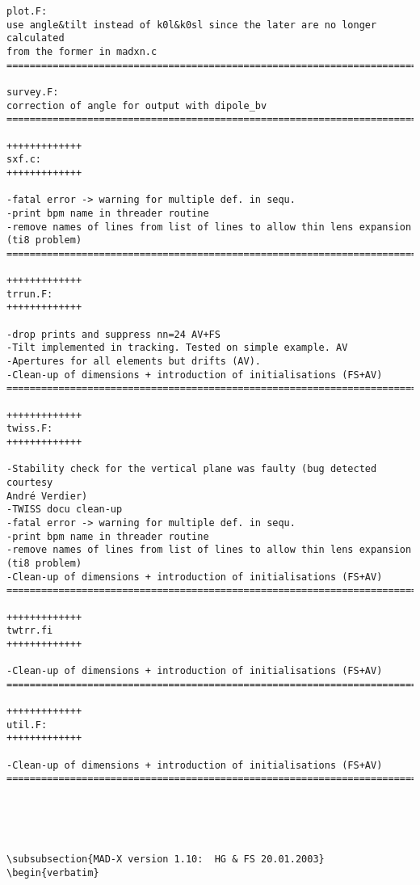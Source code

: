 \begin{verbatim}
plot.F:
use angle&tilt instead of k0l&k0sl since the later are no longer calculated
from the former in madxn.c
=============================================================================

survey.F:
correction of angle for output with dipole_bv
=============================================================================

+++++++++++++
sxf.c:
+++++++++++++

-fatal error -> warning for multiple def. in sequ.
-print bpm name in threader routine
-remove names of lines from list of lines to allow thin lens expansion (ti8 problem)
=============================================================================

+++++++++++++
trrun.F:
+++++++++++++

-drop prints and suppress nn=24 AV+FS
-Tilt implemented in tracking. Tested on simple example. AV
-Apertures for all elements but drifts (AV).
-Clean-up of dimensions + introduction of initialisations (FS+AV)
=============================================================================

+++++++++++++
twiss.F:
+++++++++++++

-Stability check for the vertical plane was faulty (bug detected courtesy
André Verdier)
-TWISS docu clean-up
-fatal error -> warning for multiple def. in sequ.
-print bpm name in threader routine
-remove names of lines from list of lines to allow thin lens expansion (ti8 problem)
-Clean-up of dimensions + introduction of initialisations (FS+AV)
=============================================================================

+++++++++++++
twtrr.fi
+++++++++++++

-Clean-up of dimensions + introduction of initialisations (FS+AV)
=============================================================================

+++++++++++++
util.F:
+++++++++++++

-Clean-up of dimensions + introduction of initialisations (FS+AV)
=============================================================================





\subsubsection{MAD-X version 1.10:  HG & FS 20.01.2003}
\begin{verbatim}


\end{verbatim}
